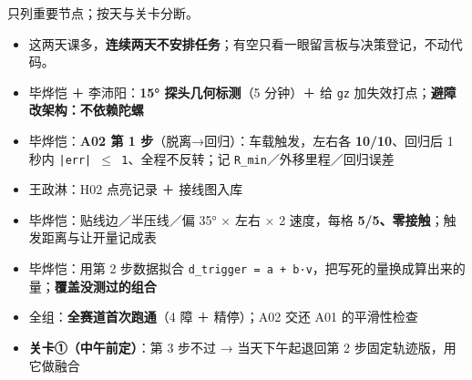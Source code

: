 \documentclass[10.5pt]{article}
\newcommand{\sect}[1]{\par\vspace{9pt}{\large\bfseries\color{accent}#1}\par\vspace{3pt}}
\begin{document}
\sect{4. 交接时间线（按节点）}
{\small 只列重要节点；按天与关卡分断。\par}
\par\vspace{2pt}
\begin{itemize}\setlength{\itemsep}{1pt}\setlength{\parskip}{0pt}
\item 这两天课多，\textbf{连续两天不安排任务}；有空只看一眼留言板与决策登记，不动代码。
\end{itemize}
\par\vspace{2pt}
\begin{itemize}\setlength{\itemsep}{1pt}\setlength{\parskip}{0pt}
\item 毕烨恺 ＋ 李沛阳：\textbf{15° 探头几何标测}（5 分钟）＋ 给 \texttt{gz} 加失效打点；\textbf{避障改架构：不依赖陀螺}
\item 毕烨恺：\textbf{A02 第 1 步}（脱离→回归）：车载触发，左右各 \textbf{10/10}、回归后 1 秒内 \texttt{|err| $\leq$  1}、全程不反转；记 \texttt{R\_min}／外移里程／回归误差
\item 王政淋：H02 点亮记录 ＋ 接线图入库
\end{itemize}
\par\vspace{2pt}
\begin{itemize}\setlength{\itemsep}{1pt}\setlength{\parskip}{0pt}
\item 毕烨恺：贴线边／半压线／偏 35° × 左右 × 2 速度，每格 \textbf{5/5、零接触}；触发距离与让开量记成表
\end{itemize}
\par\vspace{2pt}
\begin{itemize}\setlength{\itemsep}{1pt}\setlength{\parskip}{0pt}
\item 毕烨恺：用第 2 步数据拟合 \texttt{d\_trigger = a + b·v}，把写死的量换成算出来的量；\textbf{覆盖没测过的组合}
\item 全组：\textbf{全赛道首次跑通}（4 障 ＋ 精停）；A02 交还 A01 的平滑性检查
\item \textbf{关卡①（中午前定）}：第 3 步不过 → 当天下午起退回第 2 步固定轨迹版，用它做融合
\end{itemize}
\end{document}
